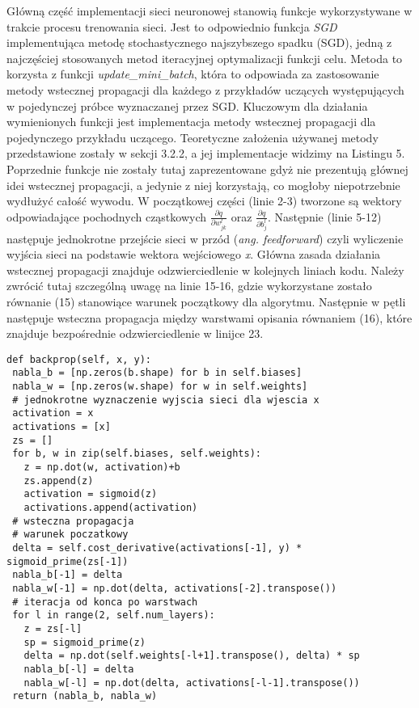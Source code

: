 \par Główną część implementacji sieci neuronowej stanowią funkcje wykorzystywane w trakcie procesu trenowania sieci. Jest to odpowiednio funkcja \emph{SGD} implementująca metodę stochastycznego najszybszego spadku (SGD), jedną z najczęściej stosowanych metod iteracyjnej optymalizacji funkcji celu. Metoda to korzysta z funkcji \emph{update{\_}mini{\_}batch}, która to odpowiada za zastosowanie metody wstecznej propagacji dla każdego z przykładów uczących występujących w pojedynczej próbce wyznaczanej przez SGD. Kluczowym dla działania wymienionych funkcji jest implementacja metody wstecznej propagacji dla pojedynczego przykładu uczącego. Teoretyczne założenia używanej metody przedstawione zostały w sekcji 3.2.2, a jej implementacje widzimy na Listingu 5. Poprzednie funkcje nie zostały tutaj zaprezentowane gdyż nie prezentują głównej idei wstecznej propagacji, a jedynie z niej korzystają, co mogłoby niepotrzebnie wydłużyć całość wywodu. W początkowej części (linie 2-3) tworzone są wektory odpowiadające pochodnych cząstkowych \( \frac{\partial q}{\partial w_{jk}^l} \) oraz \( \frac{\partial q}{\partial b_j^l} \). Następnie (linie 5-12) następuje jednokrotne przejście sieci w przód (\emph{ang. feedforward}) czyli wyliczenie wyjścia sieci na podstawie wektora wejściowego \emph{x}. Główna zasada działania wstecznej propagacji znajduje odzwierciedlenie w kolejnych liniach kodu. Należy zwrócić tutaj szczególną uwagę na linie 15-16, gdzie wykorzystane zostało równanie (15) stanowiące warunek początkowy dla algorytmu. Następnie w pętli następuje wsteczna propagacja między warstwami opisania równaniem (16), które znajduje bezpośrednie odzwierciedlenie w linijce 23.

\begin{listing}[!htb]
\begin{verbatim}
def backprop(self, x, y):
 nabla_b = [np.zeros(b.shape) for b in self.biases]
 nabla_w = [np.zeros(w.shape) for w in self.weights]
 # jednokrotne wyznaczenie wyjscia sieci dla wjescia x
 activation = x
 activations = [x] 
 zs = []
 for b, w in zip(self.biases, self.weights):
   z = np.dot(w, activation)+b
   zs.append(z)
   activation = sigmoid(z)
   activations.append(activation)
 # wsteczna propagacja
 # warunek poczatkowy
 delta = self.cost_derivative(activations[-1], y) * sigmoid_prime(zs[-1])
 nabla_b[-1] = delta
 nabla_w[-1] = np.dot(delta, activations[-2].transpose())
 # iteracja od konca po warstwach
 for l in range(2, self.num_layers):
   z = zs[-l]
   sp = sigmoid_prime(z)
   delta = np.dot(self.weights[-l+1].transpose(), delta) * sp
   nabla_b[-l] = delta
   nabla_w[-l] = np.dot(delta, activations[-l-1].transpose())
 return (nabla_b, nabla_w)
\end{verbatim}
\end{listing}

